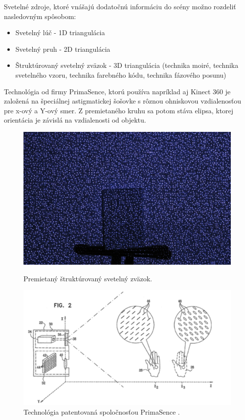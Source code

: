   

Svetelné zdroje, ktoré vnášajú dodatočnú informáciu do scény možno rozdeliť nasledovným spôsobom: 
\begin{itemize}
\item Svetelný lúč - 1D triangulácia 
\item Svetelný pruh - 2D triangulácia 
\item Štruktúrovaný svetelný zväzok - 3D triangulácia (technika moiré, technika svetelného vzoru, technika farebného kódu, technika fázového posunu) 
\end{itemize}

Technológia od firmy PrimaSence, ktorú používa napríklad aj Kinect 360 je založená na špeciálnej astigmatickej šošovke s rôznou  ohniskovou vzdialenosťou pre x-ový a Y-ový smer. Z premietaného kruhu sa potom stáva elipsa, ktorej orientácia je závislá na vzdialenosti od objektu. \cite{how_kinect_work}

\begin{figure}[H]
  \centering
  \begin{minipage}[b]{0.40\textwidth}
    \includegraphics[width=\textwidth]{images/kinect_projector}
    \caption{Premietaný štruktúrovaný svetelný zväzok. \cite{how_kinect_work}}
  \end{minipage}
  \hfill
  \begin{minipage}[b]{0.5\textwidth}
    \includegraphics[width=\textwidth]{images/primasence}
    \caption{Technológia patentovaná spoločnosťou PrimaSence \cite{how_kinect_work}.}
  \end{minipage}
\end{figure}



